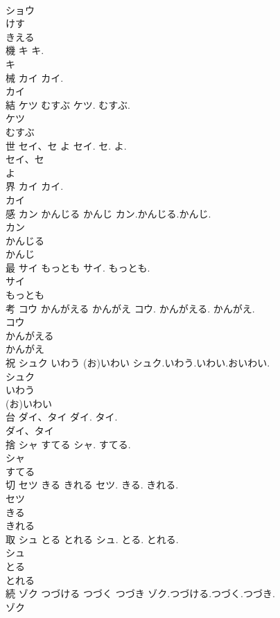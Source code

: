 \documentclass[8pt]{extreport}
\begin{document}
\begin{CJK}{UTF8}{min}
\\	ショウ
\\	けす
\\	きえる
\\	機	キ	キ.	
\\	キ
\\	械	カイ	カイ.	
\\	カイ
\\	結	ケツ むすぶ	ケツ. むすぶ.	
\\	ケツ
\\	むすぶ
\\	世	セイ、セ よ	セイ. セ. よ.	
\\	セイ、セ
\\	よ
\\	界	カイ	カイ.	
\\	カイ
\\	感	カン かんじる かんじ	カン.かんじる.かんじ.	
\\	カン
\\	かんじる
\\	かんじ
\\	最	サイ もっとも	サイ. もっとも.	
\\	サイ
\\	もっとも
\\	考	コウ かんがえる かんがえ	コウ. かんがえる. かんがえ.	
\\	コウ
\\	かんがえる
\\	かんがえ
\\	祝	シュク いわう (お)いわい	シュク.いわう.いわい.おいわい.	
\\	シュク
\\	いわう
\\	(お)いわい
\\	台	ダイ、タイ	ダイ. タイ.	
\\	ダイ、タイ
\\	捨	シャ すてる	シャ. すてる.	
\\	シャ
\\	すてる
\\	切	セツ きる きれる	セツ. きる. きれる.	
\\	セツ
\\	きる
\\	きれる
\\	取	シュ とる とれる	シュ. とる. とれる.	
\\	シュ
\\	とる
\\	とれる
\\	続	ゾク つづける つづく つづき	ゾク.つづける.つづく.つづき.	
\\	ゾク

\end{CJK}
\end{document}

